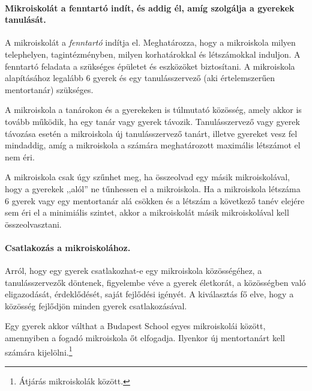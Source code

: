 \paragraph{Mikroiskolát a fenntartó indít, és addig él, amíg szolgálja a gyerekek tanulását.}
A mikroiskolát a \emph{fenntartó} indítja el. Meghatározza, hogy a mikroiskola milyen telephelyen, tagintézményben, milyen korhatárokkal és létszámokkal induljon. A fenntartó feladata a szükséges épületet és eszközöket biztosítani. A mikroiskola alapításához legalább 6 gyerek és egy tanulásszervező (aki értelemszerűen mentortanár) szükséges.

A mikroiskola a tanárokon és a gyerekeken is túlmutató közösség, amely akkor is tovább működik, ha egy tanár vagy gyerek távozik. Tanulásszervező vagy gyerek távozása esetén a mikroiskola  új tanulásszervező tanárt, illetve gyereket vesz fel mindaddig, amíg a mikroiskola a számára meghatározott maximális létszámot el nem éri.

A mikroiskola csak úgy szűnhet meg, ha összeolvad egy másik mikroiskolával, hogy a gyerekek ,,alól'' ne tűnhessen el a mikroiskola. Ha a mikroiskola létszáma 6 gyerek vagy egy mentortanár alá csökken és a létszám a következő tanév elejére sem éri el a minimiális szintet, akkor a mikroiskolát másik mikroiskolával kell összeolvasztani.

\paragraph{Csatlakozás a mikroiskolához.}
Arról, hogy egy gyerek csatlakozhat-e egy mikroiskola közösségéhez, a tanulásszervezők döntenek, figyelembe véve a gyerek életkorát, a közösségben való eligazodását, érdeklődését, saját fejlődési igényét. A kiválasztás fő elve,  hogy a közösség fejlődjön minden gyerek csatlakozásával.

Egy gyerek akkor válthat a Budapest School egyes mikroiskolái között, amennyiben a fogadó mikroiskola őt elfogadja. Ilyenkor új mentortanárt kell számára kijelölni.\footnote{Átjárás mikroiskolák között.}
